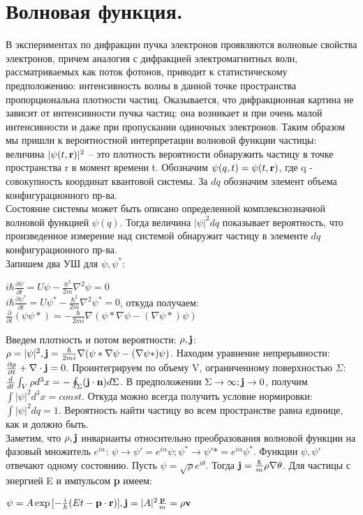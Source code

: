 \section {Волновая функция.}
В экспериментах по дифракции пучка электронов проявляются волновые свойства электронов, причем аналогия с дифракцией электромагнитных волн, рассматриваемых как поток фотонов, приводит к статистическому предположению: интенсивность волны в данной точке пространства пропорциональна плотности частиц. Оказывается, что дифракционная картина не зависит от интенсивности пучка частиц: она возникает и при очень малой интенсивности и даже при пропускании одиночных электронов. Таким образом мы пришли к вероятностной интерпретации волновой функции частицы: величина $|\psi(t, {\bf r})|^2$ -- это плотность вероятности обнаружить частицу в точке пространства r в момент времени t. Обозначим $\psi(q, t) = \psi(t, {\bf r})$, где q - совокупность координат квантовой системы. За $dq$ обозначим элемент объема конфигурационного пр-ва.\\
Состояние системы может быть описано определенной комплекснозначной волновой функцией $\psi(q)$. Тогда величина $|\psi|^2dq$ показывает вероятность, что произведенное измерение над системой обнаружит частицу в элементе $dq$ конфигурационного пр-ва. \\
Запишем два УШ для $\psi, \psi^*$:
\begin{center}
$i\hbar\frac{\partial \psi     }{\partial t} = U\psi     - \frac{\hbar^2}{2m}\nabla^2\psi     = 0$\\
$i\hbar\frac{\partial \psi^*}{\partial t} = U\psi^* - \frac{\hbar^2}{2m}\nabla^2\psi^*= 0$, откуда получаем:\\
$\frac{\partial}{\partial t}(\psi\psi*) = -\frac{\hbar}{2mi}\nabla(\psi*\nabla\psi - (\nabla\psi*)\psi)$
\end{center}
Введем плотность и потом вероятности: $\rho, {\bf j}$: $\rho = |\psi|^2, {\bf j} = \frac{\hbar}{2mi}\nabla(\psi*\nabla\psi - (\nabla\psi*)\psi)$. Находим уравнение непрерывности: $\frac{\partial \rho}{\partial t} + \nabla \cdot {\bf j} = 0$. Проинтегрируем по объему V, ограниченному поверхностью $\Sigma$: $\frac{d}{dt}\int_V\rho d^3x = - \oint_{\Sigma}({\bf j \cdot n})d\Sigma$. В предположении $\Sigma \rightarrow \infty; {\bf j}\rightarrow 0$, получим $\int|\psi|^2d^3x = const $. Откуда можно всегда получить условие нормировки: $\int |\psi|^2dq = 1$. Вероятность найти частицу во всем пространстве равна единице, как и должно быть.\\
Заметим, что $\rho, {\bf j}$ инварианты относительно преобразования волновой функции на фазовый множитель $e^{i\alpha}$: $\psi \rightarrow \psi' = e^{i\alpha}\psi; \psi^* \rightarrow \psi'* = e^{i\alpha}\psi^*$. Функции $\psi, \psi'$ отвечают одному состоянию. Пусть $\psi = \sqrt{\rho}e^{i\theta}$. Тогда ${\bf j} = \frac{\hbar}{m}\rho\nabla\theta$. Для частицы с энергией E и импульсом {\bf p} имеем:
\begin{center}
$\psi = A\exp{[-\frac{i}{\hbar}(Et - {\bf p \cdot r})]}, {\bf j} = |A|^2\frac{{\bf p}}{m} = \rho{\bf v}$
\end{center}